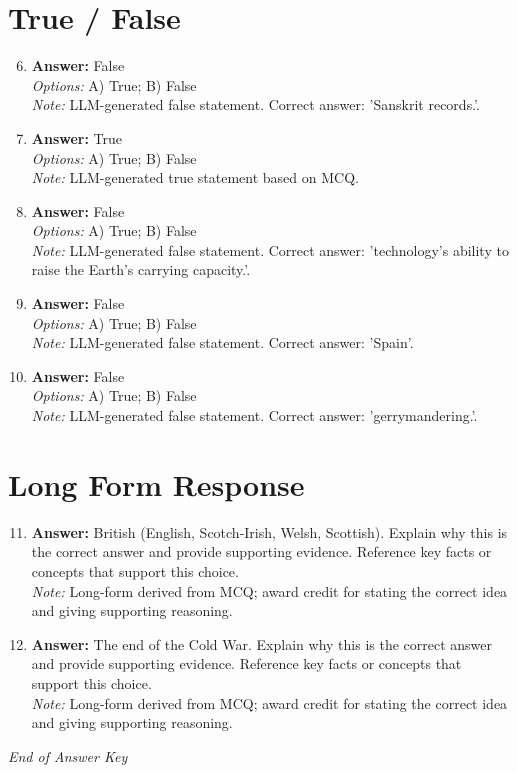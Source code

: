 \documentclass[12pt]{article}
\begin{document}
\section*{True / False}
\begin{enumerate}[label=\arabic*.]
\setcounter{enumi}{5}
\item \textbf{Answer:} False
\\ \textit{Options:} A) True; B) False
\\ \textit{Note:} LLM-generated false statement. Correct answer: 'Sanskrit records.'.
\item \textbf{Answer:} True
\\ \textit{Options:} A) True; B) False
\\ \textit{Note:} LLM-generated true statement based on MCQ.
\item \textbf{Answer:} False
\\ \textit{Options:} A) True; B) False
\\ \textit{Note:} LLM-generated false statement. Correct answer: 'technology's ability to raise the Earth's carrying capacity.'.
\item \textbf{Answer:} False
\\ \textit{Options:} A) True; B) False
\\ \textit{Note:} LLM-generated false statement. Correct answer: 'Spain'.
\item \textbf{Answer:} False
\\ \textit{Options:} A) True; B) False
\\ \textit{Note:} LLM-generated false statement. Correct answer: 'gerrymandering.'.
\end{enumerate}

\section*{Long Form Response}
\begin{enumerate}[label=\arabic*.]
\setcounter{enumi}{10}
\item \textbf{Answer:} British (English, Scotch-Irish, Welsh, Scottish). Explain why this is the correct answer and provide supporting evidence. Reference key facts or concepts that support this choice.
\\ \textit{Note:} Long-form derived from MCQ; award credit for stating the correct idea and giving supporting reasoning.
\item \textbf{Answer:} The end of the Cold War. Explain why this is the correct answer and provide supporting evidence. Reference key facts or concepts that support this choice.
\\ \textit{Note:} Long-form derived from MCQ; award credit for stating the correct idea and giving supporting reasoning.
\end{enumerate}

\vfill
\noindent\textit{End of Answer Key}
\end{document}
